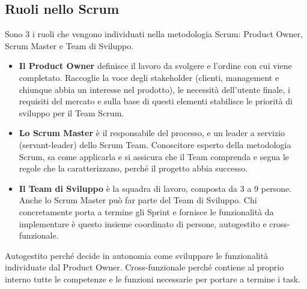 \documentclass[a4paper,12pt,titlepage,oneside]{book}
\begin{document}
\subsection{Ruoli nello Scrum}
    Sono 3 i ruoli che vengono individuati nella metodologia Scrum: Product Owner, Scrum Master e Team di Sviluppo.
\begin{itemize}
    \item \textbf{Il Product Owner} definisce il lavoro da svolgere e l’ordine con cui viene completato. Raccoglie la voce degli stakeholder (clienti, management e chiunque abbia un interesse nel prodotto), le necessità dell’utente finale, i requisiti del mercato e sulla base di questi elementi 
        stabilisce le priorità di sviluppo per il Team Scrum.
    \item \textbf{Lo Scrum Master} è il responsabile del processo, e un leader a servizio (servant-leader) dello Scrum Team. Conoscitore esperto della metodologia Scrum, sa come applicarla e si assicura che il Team comprenda e segua le regole che la caratterizzano, perché il progetto abbia successo.
    \item \textbf{Il Team di Sviluppo} è la squadra di lavoro, composta da 3 a 9 persone. Anche lo Scrum Master può far parte del Team di Sviluppo. Chi concretamente porta a termine gli Sprint e fornisce le funzionalità da implementare è questo insieme coordinato di persone, autogestito e cross-funzionale.
\end{itemize}
    Autogestito perché decide in autonomia come sviluppare le funzionalità individuate dal Product Owner. Cross-funzionale perché contiene al proprio interno tutte le competenze e le funzioni necessarie per portare a termine i task.
\end{document}
